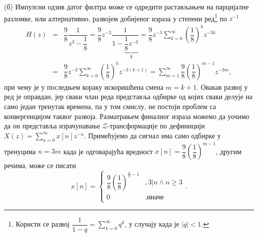 (б) Импулсни одзив датог филтра може се одредити растављањем на парцијалне разломке, или алтернативно, 
развојем добијеног израза у степени ред\footnote{ Користи се развој
$\dfrac{1}{1 - q} = \sum_{k = 0}^\infty q^k$, у случају када је $|q| < 1$. } по $z^{-1}$ 
\begin{eqnarray}
    H(z) &=& \dfrac{9}{8} \dfrac{1}{z^3 - \dfrac{1}{8}} =
           \dfrac{9}{8} z^{-3} \dfrac{1}{1 - \underbrace{\dfrac{1}{8}z^{-3}}_q }
         = \dfrac{9}{8} z^{-3} \sum_{k = 0}^{\infty} \left(\dfrac{1}{8}\right)^k z^{-3k} \\
         &=& \dfrac{9}{8} z^{-3} \sum_{k = 0}^{\infty} \left(\dfrac{1}{8}\right)^k z^{-3(k+1)} 
        =  \sum_{m = 1}^{\infty} \dfrac{9}{8}\left(\dfrac{1}{8}\right)^{m-1} z^{-3m},
\end{eqnarray}
при чему је у последњем кораку искоришћена смена $m = k + 1$. 
Овакав развој у ред је оправдан, јер сваки члан реда представља одбирке од којих сваки делује на само један тренутак времена, 
па у том смислу, не постоји проблем са конвергенцијом таквог развоја. Разматрањем финалног израза можемо да уочимо да 
он представља израчунавање $\mathcal{Z}$-трансформације по дефиницији 
$X(z) = \sum_{n = 0}^{\infty} x[n] z^{-n}$. Примећујемо да сигнал има само одбирке у тренуцима $n = 3m$ када је 
одговарајућа вредност $x[n] = \dfrac{9}{8}\left(\dfrac{1}{8}\right)^{m-1}$, другим речима, може се писати 
\begin{equation}
    x[n] = \begin{cases}
        \dfrac{9}{8}\left(\dfrac{1}{8}\right)^{\frac{n}{3}-1} &, 3|n \land n \geq 3 \\
        0 &, \text{иначе}
    \end{cases}.
\end{equation}
